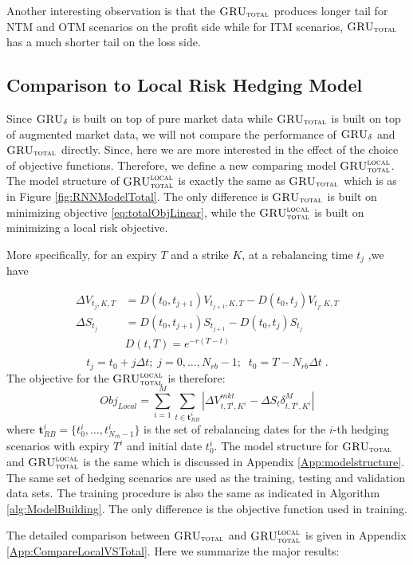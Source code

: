 \documentclass[letterpaper,12pt,titlepage,oneside,final]{book}
\numberwithin{equation}{section}
\theoremstyle{definition}
\newcommand{\model}{\textsc{GRU}_\delta}
\newcommand{\modelT}{\textsc{GRU}_{\textsc{total}}}
\newcommand{\modelL}{\textsc{GRU}_{\textsc{total}}^{\textsc{local}}}
\newcommand{\DS}{\Delta S}
\newcommand{\DT}{\Delta t}
\newcommand{\Smkt}{S}
\begin{document}
Another interesting observation is that the $\modelT$ produces longer tail for NTM and OTM scenarios on the profit side while for ITM scenarios, $\modelT$  has a much shorter tail on the loss side.
\subsection{Comparison to Local Risk Hedging Model}
Since $\model$ is built on top of pure market data while $\modelT$ is built on top of augmented market data, we will not compare the performance of  $\model$ and $\modelT$ directly. Since, here we are more interested in the effect of the choice of objective functions. Therefore, we define a new comparing model $\modelL$. The model structure of $\modelL$ is exactly the same as  $\modelT$ which is as in Figure \ref{fig:RNNModelTotal}.  The only difference is $\modelT$ is built on minimizing objective \eqref{eq:totalObjLinear}, while the $\modelL$ is built on minimizing a local risk objective. 

More specifically, for an expiry $T$ and a strike $K$,  at a rebalancing time $t_j$ ,we have

\[
\begin{split}
\Delta V_{t_j,K,T}& =D(t_0,t_{j+1}) V_{t_{j+1},K,T}-D(t_0,t_{j})V_{t_j,K,T}\\
\Delta \Smkt_{t_j} &=D(t_0,t_{j+1}) \Smkt_{t_{j+1}}-D(t_0,t_{j}) \Smkt_{t_{j}}\\
&D(t,T)=e^{-r(T-t)}\\
\end{split}
\]
\[
t_j=t_0+j \Delta t;\; j=0,\dots,N_{rb}-1;\;\;t_0=T-N_{rb}\DT\;.
\]
The objective for the  $\modelL$  is therefore:
\begin{equation}
Obj_{Local}=\sum_{i=1}^M \sum_{t\in \mathbf{t}^i_{RB}} |\Delta V^{mkt}_{t,T^i,K^i}-\DS_{t} \delta^{M}_{t,T^i,K^i}|
\label{eq:LocalObjNew}
\end{equation}
where $\mathbf{t}^i_{RB}=\{t^i_0,\dots, t^i_{N_{rb}-1}\}$ is the set of rebalancing dates for the $i$-th hedging scenarios with expiry $T^i$ and initial date $t^i_0$. The model structure for $\modelT$ and  $\modelL$ is the same which is discussed in Appendix \ref{App:modelstructure}. The same set of hedging scenarios are used as the training, testing and validation data sets. The training procedure is also the same as indicated in Algorithm \ref{alg:ModelBuilding}. The only difference is the objective function used in training.


The detailed comparison between $\modelT$ and $\modelL$ is given in Appendix \ref{App:CompareLocalVSTotal}. Here we summarize the major results:
\end{document}
